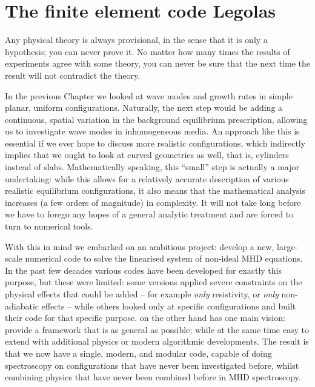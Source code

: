 \chapter{The finite element code Legolas} \label{ch: Legolas}

\graphicspath{{04-legolas/figures/}}

\begin{chapterquote}
  Any physical theory is always provisional, in the sense that it is only a hypothesis; you can never prove it. No matter how many times the results of experiments agree with some theory, you can never be sure that the next time the result will not contradict the theory.
\end{chapterquote}


In the previous Chapter we looked at wave modes and growth rates in simple planar, uniform configurations. Naturally, the next step would be adding a continuous, spatial variation in the background equilibrium prescription, allowing us to investigate wave modes in inhomogeneous media. An approach like this is essential if we ever hope to discuss more realistic configurations, which indirectly implies that we ought to look at curved geometries as well, that is, cylinders instead of slabs. Mathematically speaking, this ``small'' step is actually a major undertaking: while this allows for a relatively accurate description of various realistic equilibrium configurations, it also means that the mathematical analysis increases (a few orders of magnitude) in complexity. It will not take long before we have to forego any hopes of a general analytic treatment and are forced to turn to numerical tools.

With this in mind we embarked on an ambitious project: develop a new, large-scale numerical code to solve the linearised system of non-ideal MHD equations. In the past few decades various codes have been developed for exactly this purpose, but these were limited: some versions applied severe constraints on the physical effects that could be added -- for example \emph{only} resistivity, or \emph{only} non-adiabatic effects -- while others looked only at specific configurations and built their code for that specific purpose. {\legolas} on the other hand has one main vision: provide a framework that is as general as possible; while at the same time easy to extend with additional physics or modern algorithmic developments. The result is that we now have a single, modern, and modular code, capable of doing spectroscopy on configurations that have never been investigated before, whilst combining physics that have never been combined before in MHD spectroscopy.

